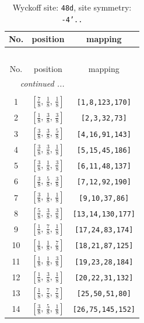 \documentclass[fleqn,8pt]{jsarticle}
\begin{document}
\begin{longtable}{ccc}
\caption{Wyckoff site: {\tt 48d}, site symmetry: {\tt -4'..}}
 \\
 \hline \hline
No. & position & mapping \\ \hline \endfirsthead

\multicolumn{2}{l}{\tablename\ \thetable{}} \\
 \hline \hline
No. & position & mapping \\ \hline \endhead

 \hline \hline
\multicolumn{2}{r}{\footnotesize\it continued ...} \\ \endfoot

 \hline \hline
\multicolumn{2}{r}{} \\ \endlastfoot

1 & $\left[ \frac{7}{8},\, \frac{1}{8},\, \frac{1}{8} \right]$ & {\tt [1,8,123,170]} \\ \hline
2 & $\left[ \frac{1}{8},\, \frac{3}{8},\, \frac{3}{8} \right]$ & {\tt [2,3,32,73]} \\ \hline
3 & $\left[ \frac{3}{8},\, \frac{3}{8},\, \frac{5}{8} \right]$ & {\tt [4,16,91,143]} \\ \hline
4 & $\left[ \frac{3}{8},\, \frac{3}{8},\, \frac{1}{8} \right]$ & {\tt [5,15,45,186]} \\ \hline
5 & $\left[ \frac{3}{8},\, \frac{1}{8},\, \frac{3}{8} \right]$ & {\tt [6,11,48,137]} \\ \hline
6 & $\left[ \frac{3}{8},\, \frac{5}{8},\, \frac{3}{8} \right]$ & {\tt [7,12,92,190]} \\ \hline
7 & $\left[ \frac{3}{8},\, \frac{1}{8},\, \frac{1}{8} \right]$ & {\tt [9,10,37,86]} \\ \hline
8 & $\left[ \frac{5}{8},\, \frac{3}{8},\, \frac{3}{8} \right]$ & {\tt [13,14,130,177]} \\ \hline
9 & $\left[ \frac{1}{8},\, \frac{7}{8},\, \frac{1}{8} \right]$ & {\tt [17,24,83,174]} \\ \hline
10 & $\left[ \frac{1}{8},\, \frac{1}{8},\, \frac{7}{8} \right]$ & {\tt [18,21,87,125]} \\ \hline
11 & $\left[ \frac{1}{8},\, \frac{1}{8},\, \frac{3}{8} \right]$ & {\tt [19,23,28,184]} \\ \hline
12 & $\left[ \frac{1}{8},\, \frac{3}{8},\, \frac{1}{8} \right]$ & {\tt [20,22,31,132]} \\ \hline
13 & $\left[ \frac{1}{8},\, \frac{7}{8},\, \frac{7}{8} \right]$ & {\tt [25,50,51,80]} \\ \hline
14 & $\left[ \frac{3}{8},\, \frac{5}{8},\, \frac{1}{8} \right]$ & {\tt [26,75,145,152]} \\ \hline

\end{longtable}
\end{document}
